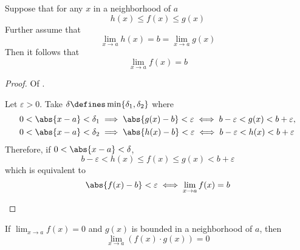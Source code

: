 \begin{thm}\label{thm-sandwich-theorem}
    Suppose that for any $x$ in a neighborhood of $a$
    \begin{equation*}
        h(x) \leq f(x) \leq g(x)
    \end{equation*}
    Further assume that
    \begin{equation*}
        \lim_{x \to a}h(x) = b = \lim_{x \to a}g(x)
    \end{equation*} 
    Then it follows that
    \begin{equation*}
        \lim_{x \to a}f(x) = b
    \end{equation*}
\end{thm}

\begin{proof}
    Of .
    \begin{flushleft}
        Let $\varepsilon>0$. Take $\delta\defines\min\{\delta_1,\delta_2\}$ where
        \begin{align*}
            &0 < \abs{x - a} < \delta_1 \implies \abs{g(x) - b} < \varepsilon \iff b - \varepsilon < g(x) < b + \varepsilon, \\
            &0 < \abs{x - a} < \delta_2 \implies \abs{h(x) - b} < \varepsilon \iff b - \varepsilon < h(x) < b + \varepsilon
        \end{align*}
        Therefore, if $0 < \abs{x - a} < \delta$,
        \begin{equation*}
            b - \varepsilon < h(x) \leq f(x) \leq g(x) < b + \varepsilon
        \end{equation*}
        which is equivalent to
        \begin{equation*}
            \abs{f(x) - b} < \varepsilon \iff \lim_{x \to a}f(x) = b
        \end{equation*}
    \end{flushleft}
\end{proof}

\begin{thm}\label{thm-product-of-bounded-zero-limit}
    If $\displaystyle\lim_{x \to a}f(x) = 0$ and $g(x)$ is bounded in a neighborhood
    of $a$, then
    \begin{equation*}
        \lim_{x \to a} \left(f(x)\cdot g(x)\right) = 0
    \end{equation*}
\end{thm}

